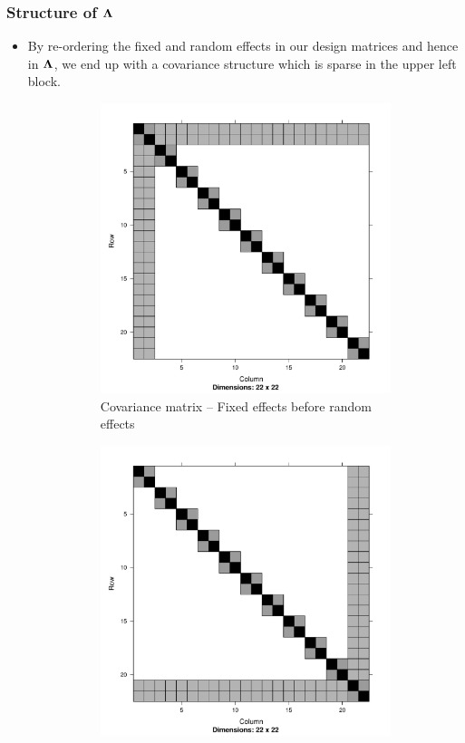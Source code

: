 \documentclass{beamer}
\begin{document}
	\begin{frame}
		\frametitle{Structure of ${\boldsymbol \Lambda}$}
		\begin{itemize}
			\item By re-ordering the fixed and random effects in our design matrices and hence
				  in ${\boldsymbol \Lambda}$, we end up with a covariance structure which is sparse in the 
				  upper left block.
			      \begin{figure}
			      	\begin{subfigure}{0.4\textwidth}
			      		\includegraphics[scale=.15]{mX_mZ_mLambda.pdf}
			      		\caption{\tiny Covariance matrix -- Fixed effects before random effects}
			      	\end{subfigure}
			      	\begin{subfigure}{0.4\textwidth}
			      		\includegraphics[scale=.15]{mZ_mX_mLambda.pdf}

\end{subfigure}
\end{figure}
\end{itemize}
\end{frame}
\end{document}
